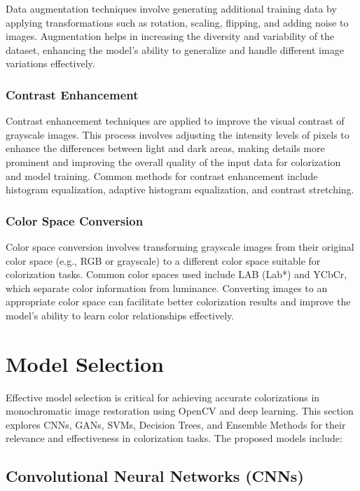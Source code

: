 Data augmentation techniques involve generating additional training data by applying transformations such as rotation, scaling, flipping, and adding noise to images. Augmentation helps in increasing the diversity and variability of the dataset, enhancing the model's ability to generalize and handle different image variations effectively.

\subsubsection{Contrast Enhancement}

Contrast enhancement techniques are applied to improve the visual contrast of grayscale images. This process involves adjusting the intensity levels of pixels to enhance the differences between light and dark areas, making details more prominent and improving the overall quality of the input data for colorization and model training. Common methods for contrast enhancement include histogram equalization, adaptive histogram equalization, and contrast stretching.

\subsubsection{Color Space Conversion}

Color space conversion involves transforming grayscale images from their original color space (e.g., RGB or grayscale) to a different color space suitable for colorization tasks. Common color spaces used include LAB (Lab*) and YCbCr, which separate color information from luminance. Converting images to an appropriate color space can facilitate better colorization results and improve the model's ability to learn color relationships effectively.

\section{Model Selection}


Effective model selection is critical for achieving accurate colorizations in monochromatic image restoration using OpenCV and deep learning. This section explores CNNs, GANs, SVMs, Decision Trees, and Ensemble Methods for their relevance and effectiveness in colorization tasks. The proposed models include:

\subsection{Convolutional Neural Networks (CNNs)}

